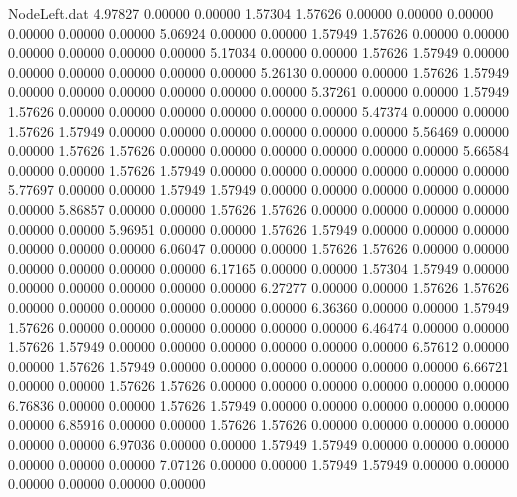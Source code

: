 \begin{filecontents}{NodeLeft.dat}
   4.97827    0.00000    0.00000     1.57304    1.57626    0.00000    0.00000    0.00000    0.00000    0.00000    0.00000
   5.06924    0.00000    0.00000     1.57949    1.57626    0.00000    0.00000    0.00000    0.00000    0.00000    0.00000
   5.17034    0.00000    0.00000     1.57626    1.57949    0.00000    0.00000    0.00000    0.00000    0.00000    0.00000
   5.26130    0.00000    0.00000     1.57626    1.57949    0.00000    0.00000    0.00000    0.00000    0.00000    0.00000
   5.37261    0.00000    0.00000     1.57949    1.57626    0.00000    0.00000    0.00000    0.00000    0.00000    0.00000
   5.47374    0.00000    0.00000     1.57626    1.57949    0.00000    0.00000    0.00000    0.00000    0.00000    0.00000
   5.56469    0.00000    0.00000     1.57626    1.57626    0.00000    0.00000    0.00000    0.00000    0.00000    0.00000
   5.66584    0.00000    0.00000     1.57626    1.57949    0.00000    0.00000    0.00000    0.00000    0.00000    0.00000
   5.77697    0.00000    0.00000     1.57949    1.57949    0.00000    0.00000    0.00000    0.00000    0.00000    0.00000
   5.86857    0.00000    0.00000     1.57626    1.57626    0.00000    0.00000    0.00000    0.00000    0.00000    0.00000
   5.96951    0.00000    0.00000     1.57626    1.57949    0.00000    0.00000    0.00000    0.00000    0.00000    0.00000
   6.06047    0.00000    0.00000     1.57626    1.57626    0.00000    0.00000    0.00000    0.00000    0.00000    0.00000
   6.17165    0.00000    0.00000     1.57304    1.57949    0.00000    0.00000    0.00000    0.00000    0.00000    0.00000
   6.27277    0.00000    0.00000     1.57626    1.57626    0.00000    0.00000    0.00000    0.00000    0.00000    0.00000
   6.36360    0.00000    0.00000     1.57949    1.57626    0.00000    0.00000    0.00000    0.00000    0.00000    0.00000
   6.46474    0.00000    0.00000     1.57626    1.57949    0.00000    0.00000    0.00000    0.00000    0.00000    0.00000
   6.57612    0.00000    0.00000     1.57626    1.57949    0.00000    0.00000    0.00000    0.00000    0.00000    0.00000
   6.66721    0.00000    0.00000     1.57626    1.57626    0.00000    0.00000    0.00000    0.00000    0.00000    0.00000
   6.76836    0.00000    0.00000     1.57626    1.57949    0.00000    0.00000    0.00000    0.00000    0.00000    0.00000
   6.85916    0.00000    0.00000     1.57626    1.57626    0.00000    0.00000    0.00000    0.00000    0.00000    0.00000
   6.97036    0.00000    0.00000     1.57949    1.57949    0.00000    0.00000    0.00000    0.00000    0.00000    0.00000
   7.07126    0.00000    0.00000     1.57949    1.57949    0.00000    0.00000    0.00000    0.00000    0.00000    0.00000

\end{filecontents}
